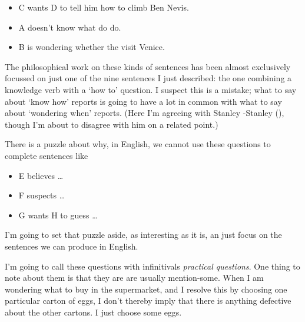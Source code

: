 \documentclass[
  10pt,
  letterpaper,
  twoside]{scrbook}
\providecommand{\tightlist}{%
  \setlength{\itemsep}{0pt}\setlength{\parskip}{0pt}}\usepackage{longtable,booktabs,array}
\begin{document}
\begin{itemize}
\tightlist
\item
  C wants D to tell him how to climb Ben Nevis.
\item
  A doesn't know what do do.
\item
  B is wondering whether the visit Venice.
\end{itemize}

The philosophical work on these kinds of sentences has been almost
exclusively focussed on just one of the nine sentences I just described:
the one combining a knowledge verb with a `how to' question. I suspect
this is a mistake; what to say about `know how' reports is going to have
a lot in common with what to say about `wondering when' reports. (Here
I'm agreeing with Stanley -Stanley (),
though I'm about to disagree with him on a related point.)

There is a puzzle about why, in English, we cannot use these questions
to complete sentences like

\begin{itemize}
\tightlist
\item
  E believes \ldots{}
\item
  F suspects \ldots{}
\item
  G wants H to guess \ldots{}
\end{itemize}

I'm going to set that puzzle aside, as interesting as it is, an just
focus on the sentences we can produce in English.

I'm going to call these questions with infinitivals \emph{practical
questions}. One thing to note about them is that they are are usually
mention-some. When I am wondering what to buy in the supermarket, and I
resolve this by choosing one particular carton of eggs, I don't thereby
imply that there is anything defective about the other cartons. I just
choose some eggs.
\end{document}

